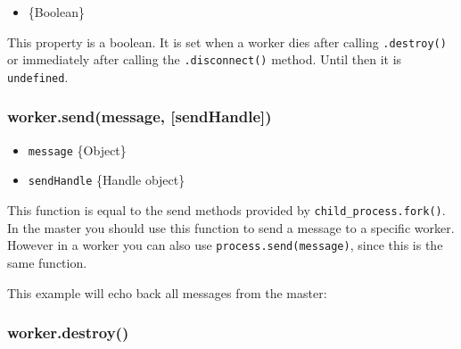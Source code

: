 \begin{itemize}
\item
  \{Boolean\}
\end{itemize}

This property is a boolean. It is set when a worker dies after calling
\texttt{.destroy()} or immediately after calling the
\texttt{.disconnect()} method. Until then it is \texttt{undefined}.

\subsubsection{worker.send(message, {[}sendHandle{]})}

\begin{itemize}
\item
  \texttt{message} \{Object\}
\item
  \texttt{sendHandle} \{Handle object\}
\end{itemize}

This function is equal to the send methods provided by
\texttt{child\_process.fork()}. In the master you should use this
function to send a message to a specific worker. However in a worker you
can also use \texttt{process.send(message)}, since this is the same
function.

This example will echo back all messages from the master:

\begin{Shaded}
\begin{Highlighting}[]
 \NormalTok{(}\NormalTok{) \{}
   \NormalTok{();}
  \NormalTok{(}\NormalTok{);}

\NormalTok{\} }  \NormalTok{(}\NormalTok{) \{}
  \NormalTok{(}\NormalTok{, }
  \NormalTok{\});}
\NormalTok{\}}
\end{Highlighting}
\end{Shaded}

\subsubsection{worker.destroy()}


